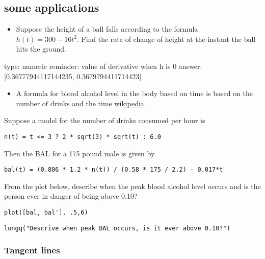 \documentclass[12pt]{article}
\begin{document}
\subsection{some applications}

\begin{itemize}
\itemsep1pt\parskip0pt
\item
  Suppose the height of a ball falls according to the formula
  $h(t) =   300 - 16t^2$. Find the rate of change of height at the
  instant the ball hits the ground.
\end{itemize}

\begin{answer}
    type: numeric
    reminder: value of derivative when h is 0
    answer: [0.36777944117144235, 0.3679794411714423]

\end{answer}

\begin{itemize}
\itemsep1pt\parskip0pt
\item
  A formula for blood alcohol level in the body based on time is based
  on the number of drinks and the time
  \href{http://en.wikipedia.org/wiki/Blood_alcohol_content}{wikipedia}.
\end{itemize}

Suppose a model for the number of drinks consumed per hour is



\begin{verbatim}
n(t) = t <= 3 ? 2 * sqrt(3) * sqrt(t) : 6.0
\end{verbatim}
Then the BAL for a 175 pound male is given by



\begin{verbatim}
bal(t) = (0.806 * 1.2 * n(t)) / (0.58 * 175 / 2.2) - 0.017*t
\end{verbatim}
From the plot below, describe when the peak blood alcohol level occurs
and is the person ever in danger of being above 0.10?



\begin{verbatim}
plot([bal, bal'], .5,6)
\end{verbatim}


\begin{verbatim}
longq("Descrive when peak BAL occurs, is it ever above 0.10?")
\end{verbatim}
\subsubsection{Tangent lines}
\end{document}
